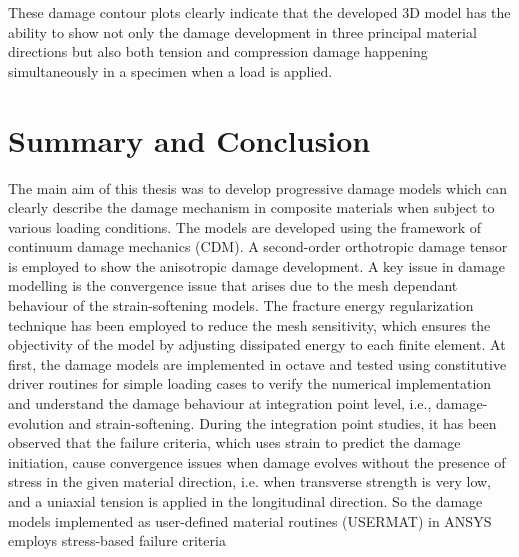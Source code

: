 \documentclass[12pt,a4paper,twoside,openright]{report}
\begin{document}
\indent\indent\indent These damage contour plots clearly indicate that the developed 3D model has the ability to show not only the damage development in three principal material directions but also both tension and compression damage happening simultaneously in a specimen when a load is applied.

\newpage
\chapter{Summary and Conclusion}
\indent\indent\indent The main aim of this thesis was to develop progressive damage models which can clearly describe the damage mechanism in composite materials when subject to various loading conditions. The models are developed using the framework of continuum damage mechanics (CDM). A second-order orthotropic damage tensor is employed to show the anisotropic damage development. A key issue in damage modelling is the convergence issue that arises due to the mesh dependant behaviour of the strain-softening models. The fracture energy regularization technique has been employed to reduce the mesh sensitivity, which ensures the objectivity of the model by adjusting dissipated energy to each finite element. At first, the damage models are implemented in octave and tested using constitutive driver routines for simple loading cases to verify the numerical implementation and understand the damage behaviour at integration point level, i.e., damage-evolution and strain-softening. During the integration point studies, it has been observed that the failure criteria, which uses strain to predict the damage initiation, cause convergence issues when damage evolves without the presence of stress in the given material direction, i.e. when transverse strength is very low, and a uniaxial tension is applied in the longitudinal direction. So the damage models implemented as user-defined material routines (USERMAT) in ANSYS employs stress-based failure criteria\\ 
\end{document}
